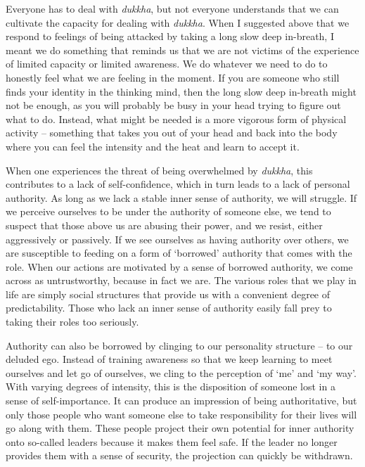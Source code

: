 Everyone has to deal with \emph{dukkha}, but not everyone understands
that we can cultivate the capacity for dealing with \emph{dukkha}. When
I suggested above that we respond to feelings of being attacked by
taking a long slow deep in-breath, I meant we do something that reminds
us that we are not victims of the experience of limited capacity or
limited awareness. We do whatever we need to do to honestly feel what we are feeling in the moment. If you are someone who still finds your
identity in the thinking mind, then the long slow deep in-breath might
not be enough, as you will probably be busy in your head trying to
figure out what to do. Instead, what might be needed is a more vigorous
form of physical activity -- something that takes you out of your head
and back into the body where you can feel the intensity and the heat and
learn to accept it.

When one experiences the threat of being overwhelmed by \emph{dukkha},
this contributes to a lack of self-confidence, which in turn leads to a
lack of personal authority. As long as we lack a stable inner sense of
authority, we will struggle. If we perceive ourselves to be under the
authority of someone else, we tend to suspect that those above us are
abusing their power, and we resist, either aggressively or passively. If
we see ourselves as having authority over others, we are susceptible to
feeding on a form of `borrowed' authority that comes with the role. When
our actions are motivated by a sense of borrowed authority, we come
across as untrustworthy, because in fact we are. The various roles that
we play in life are simply social structures that provide us with a
convenient degree of predictability. Those who lack an inner sense of
authority easily fall prey to taking their roles too seriously.

Authority can also be borrowed by clinging to our personality structure
-- to our deluded ego. Instead of training awareness so that we keep
learning to meet ourselves and let go of ourselves, we cling to the
perception of `me' and `my way'. With varying degrees of intensity, this
is the disposition of someone lost in a sense of self-importance. It can
produce an impression of being authoritative, but only those people who
want someone else to take responsibility for their lives will go along
with them. These people project their own potential for inner authority
onto so-called leaders because it makes them feel safe. If the leader no
longer provides them with a sense of security, the projection can
quickly be withdrawn.

